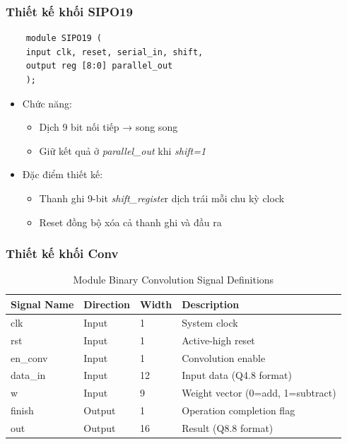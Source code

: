 \subsubsection{Thiết kế khối SIPO19}
\begin{verbatim}
    module SIPO19 (
    input clk, reset, serial_in, shift,
    output reg [8:0] parallel_out
    );
\end{verbatim}
\begin{itemize}
    \item Chức năng: 
    \begin{itemize}
        \item Dịch 9 bit nối tiếp → song song
        \item Giữ kết quả ở \textit{parallel\_out} khi \textit{shift=1}
    \end{itemize}
    \item Đặc điểm thiết kế:
    \begin{itemize}
        \item Thanh ghi 9-bit \textit{shift\_registe}r dịch trái mỗi chu kỳ clock
        \item Reset đồng bộ xóa cả thanh ghi và đầu ra
    \end{itemize}
\end{itemize}

\subsubsection{Thiết kế khối Conv}
\begin{table}[h]
\centering
\caption{Module Binary Convolution Signal Definitions}
\label{tab:signals}
\begin{tabular}{llll}
\toprule
\textbf{Signal Name} & \textbf{Direction} & \textbf{Width} & \textbf{Description} \\
\midrule
clk & Input & 1 & System clock \\
rst & Input & 1 & Active-high reset \\
en\_conv & Input & 1 & Convolution enable \\
data\_in & Input & 12 & Input data (Q4.8 format) \\
w & Input & 9 & Weight vector (0=add, 1=subtract) \\
finish & Output & 1 & Operation completion flag \\
out & Output & 16 & Result (Q8.8 format) \\
\bottomrule
\end{tabular}
\end{table}


